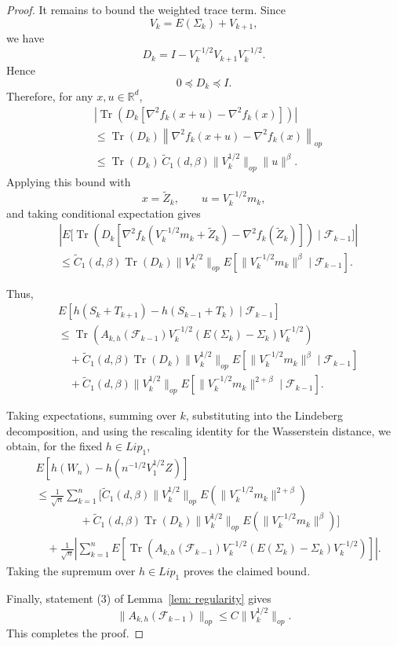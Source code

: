 \documentclass[10pt,a4paper]{amsart}
\begin{document}
\begin{proof}
It remains to bound the weighted trace term. Since
\[
    V_k=E(\Sigma_k)+V_{k+1},
\]
we have
\[
    D_k=I-V_k^{-1/2}V_{k+1}V_k^{-1/2}.
\]
Hence
\[
    0\preceq D_k\preceq I.
\]
Therefore, for any \(x,u\in\mathbb R^d\),
\begin{align*}
&\left|
\operatorname{Tr}\left(
D_k
\left[
\nabla^2 f_k(x+u)-\nabla^2 f_k(x)
\right]
\right)
\right|
\\
&\le
\operatorname{Tr}(D_k)
\left\|
\nabla^2 f_k(x+u)-\nabla^2 f_k(x)
\right\|_{op}
\\
&\le
   \operatorname{Tr}(D_k)\,\tilde C_1(d,\beta)\|V_k^{1/2}\|_{op}\|u\|^\beta.
\end{align*}
Applying this bound with
\[
    x=\widetilde Z_k,
    \qquad
    u=V_k^{-1/2}m_k,
\]
and taking conditional expectation gives
\begin{align*}
&\left|
E\biggl[
\operatorname{Tr}\left(
D_k
\left[
\nabla^2 f_k\left(V_k^{-1/2}m_k+\widetilde Z_k\right)
-
\nabla^2 f_k(\widetilde Z_k)
\right]
\right)
\mid
\mathcal F_{k-1}
\biggr]
\right|
\\
&\le
\tilde C_1(d,\beta)\operatorname{Tr}(D_k)\|V_k^{1/2}\|_{op}
E\left[
\|V_k^{-1/2}m_k\|^\beta
\mid
\mathcal F_{k-1}
\right].
\end{align*}

Thus,
\begin{align*}
& E\left[
h(S_k+T_{k+1})-h(S_{k-1}+T_k)
\mid
\mathcal F_{k-1}
\right]
\\
&\le
\operatorname{Tr}\left(
A_{k,h}(\mathcal F_{k-1})
V_k^{-1/2}
\left(E(\Sigma_k)-\Sigma_k\right)
V_k^{-1/2}
\right)
\\
&\quad
+
\tilde C_1(d,\beta)\operatorname{Tr}(D_k)\|V_k^{1/2}\|_{op}
E\left[
\|V_k^{-1/2}m_k\|^\beta
\mid
\mathcal F_{k-1}
\right]
\\
&\quad
+
\tilde C_1(d,\beta)\|V_k^{1/2}\|_{op}
E\left[
\|V_k^{-1/2}m_k\|^{2+\beta}
\mid
\mathcal F_{k-1}
\right].
\end{align*}

Taking expectations, summing over \(k\), substituting into the Lindeberg
decomposition, and using the rescaling identity for the Wasserstein distance,
we obtain, for the fixed \(h\in Lip_1\),
\begin{align*}
& E\left[
h(W_n)-h(n^{-1/2}V_1^{1/2}Z)
\right]
\\
&\le
\frac{1}{\sqrt n}\sum_{k=1}^n
\Biggl[
\tilde C_1(d,\beta)\|V_k^{1/2}\|_{op}
E\left(\|V_k^{-1/2}m_k\|^{2+\beta}\right)
\\
&\qquad\qquad
+
\tilde C_1(d,\beta)\operatorname{Tr}(D_k)\|V_k^{1/2}\|_{op}
E\left(\|V_k^{-1/2}m_k\|^\beta\right)
\Biggr]
\\
&\quad
+
\frac{1}{\sqrt n}
\left|\sum_{k=1}^n
E\left[
\operatorname{Tr}\left(
A_{k,h}(\mathcal F_{k-1})
V_k^{-1/2}
\left(E(\Sigma_k)-\Sigma_k\right)
V_k^{-1/2}
\right)
\right]
\right|.
\end{align*}
Taking the supremum over \(h\in Lip_1\) proves the claimed bound.

Finally, statement (3) of Lemma~\ref{lem: regularity} gives
\[
    \|A_{k,h}(\mathcal F_{k-1})\|_{op}
    \le
    C\|V_k^{1/2}\|_{op}.
\]
This completes the proof.
\end{proof}
\end{document}
